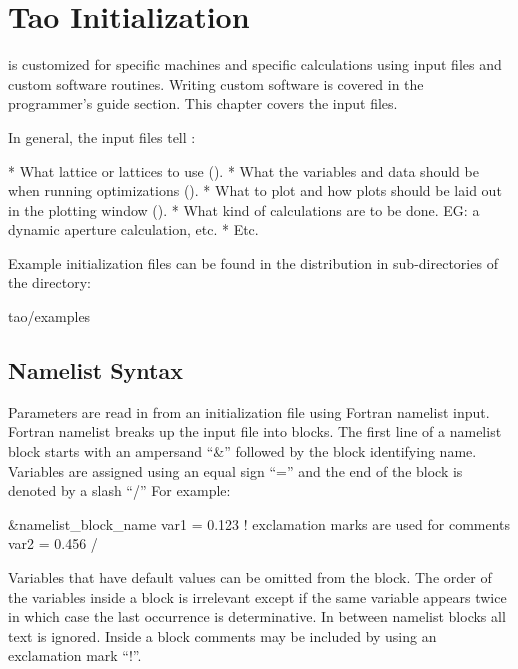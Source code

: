 \chapter{Tao Initialization}
\label{c:init}

\tao is customized for specific machines and specific calculations using input files and custom
software routines. Writing custom software is covered in the programmer's guide section. This
chapter covers the input files.

In general, the input files tell \tao:
\begin{example}
  * What \bmad lattice or lattices to use ().
  * What the variables and data should be when running optimizations ().
  * What to plot and how plots should be laid out in the plotting window ().
  * What kind of calculations are to be done. EG: a dynamic aperture calculation, etc.
  * Etc.
\end{example}

Example initialization files can be found in the \tao distribution in sub-directories of the
directory:
\begin{example}
  tao/examples
\end{example}

\section{Namelist Syntax}
\label{s:format}

Parameters are read in from an initialization file using Fortran namelist input. Fortran namelist
breaks up the input file into blocks. The first line of a namelist block starts with an ampersand
``\&'' followed by the block identifying name. Variables are assigned using an equal sign ``='' and
the end of the block is denoted by a slash ``/'' For example:
\begin{example}
  &namelist_block_name
    var1 = 0.123   ! exclamation marks are used for comments
    var2 = 0.456
  /
\end{example}
Variables that have default values can be omitted from the block.  The order of the variables inside
a block is irrelevant except if the same variable appears twice in which case the last occurrence is
determinative.  In between namelist blocks all text is ignored. Inside a block comments may be
included by using an exclamation mark ``!''.

